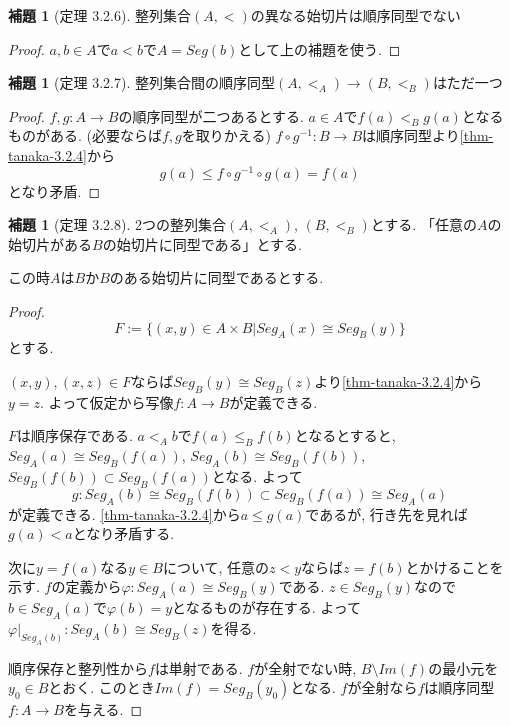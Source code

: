 \documentclass[dvipdfmx,a4paper,11pt]{article}
\theoremstyle{definition}
\newtheorem{lem}[thm]{補題}
\begin{document}
 \begin{tcolorbox}
 [colback = white, colframe = green!35!black, fonttitle = \bfseries,breakable = true]
\begin{lem}[定理 3.2.6]
\label{thm-tanaka-3.2.6}
整列集合$(A,<)$の異なる始切片は順序同型でない
\end{lem}
\end{tcolorbox}
\begin{proof}
$a , b \in A$で$a < b$で$A=Seg(b)$として上の補題を使う.
\end{proof}

 \begin{tcolorbox}
 [colback = white, colframe = green!35!black, fonttitle = \bfseries,breakable = true]
\begin{lem}[定理 3.2.7]
整列集合間の順序同型$(A,<_A) \to (B,<_B)$はただ一つ
\end{lem}
\end{tcolorbox}
\begin{proof}
$f,g :  A \to B$の順序同型が二つあるとする.
$a \in A$で$f(a) <_{B} g(a)$となるものがある. (必要ならば$f,g$を取りかえる)
$f \circ g^{-1} : B \to B $は順序同型より\ref{thm-tanaka-3.2.4}から
$$
g(a) \le f \circ g^{-1} \circ g(a) = f(a)
$$
となり矛盾.
\end{proof}

 \begin{tcolorbox}
 [colback = white, colframe = green!35!black, fonttitle = \bfseries,breakable = true]
\begin{lem}[定理 3.2.8]
\label{thm-tanaka-3.2.8}
2つの整列集合$(A,<_A)$, $(B,<_B)$とする.
「任意の$A$の始切片がある$B$の始切片に同型である」とする.

この時$A$は$B$か$B$のある始切片に同型であるとする.
\end{lem}
\end{tcolorbox}

\begin{proof}
$$
F := \{ (x,y) \in A \times B | Seg_A(x) \cong Seg_B (y)\}
$$
とする.

$(x,y), (x,z) \in F$ならば$Seg_B (y)\cong Seg_B (z)$より\ref{thm-tanaka-3.2.4}から$y=z$.
よって仮定から写像$f : A \to B$が定義できる.

$F$は順序保存である.
$a<_A b$で$f(a) \le_B f(b)$となるとすると,  
$Seg_A(a) \cong Seg_B (f(a))$, 
$Seg_A(b) \cong Seg_B (f(b))$, 
$Seg_B (f(b)) \subset Seg_B (f(a))$となる. 
よって
$$
g: Seg_{A}(b) \cong Seg_B (f(b)) \subset Seg_B (f(a)) \cong Seg_A(a)
$$
が定義できる. \ref{thm-tanaka-3.2.4}から$a \le g(a)$であるが, 行き先を見れば$g(a) < a$となり矛盾する.

次に$y = f(a)$なる$y \in B$について, 任意の$z < y$ならば$z = f(b)$とかけることを示す. 
$f$の定義から$\varphi : Seg_A(a) \cong Seg_B(y)$である. $z \in Seg_{B}(y)$なので$b \in Seg_A(a) $で$\varphi(b) =y$となるものが存在する. 
よって$\varphi|_{Seg_A(b)}: Seg_A(b) \cong Seg_B(z)$を得る. 

順序保存と整列性から$f$は単射である. 
$f$が全射でない時, $B \setminus Im(f)$の最小元を$y_0 \in B$とおく. 
このとき$Im(f) = Seg_{B}(y_0)$となる. 
$f$が全射なら$f$は順序同型$f : A \to B$を与える.

\end{proof}
\end{document}
